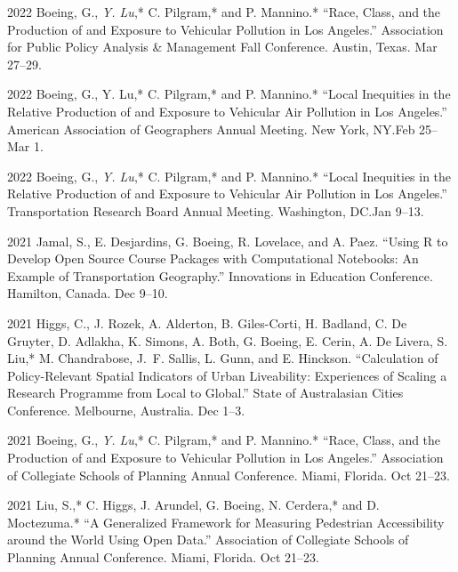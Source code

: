 \documentclass[12pt,letterpaper]{report}
\begin{document}
    \begin{tablist}

        \item[2022] \tab{}Boeing, G., \textit{Y. Lu},* C. Pilgram,* and P. Mannino.* \enquote{Race, Class, and the Production of and Exposure to Vehicular Pollution in Los Angeles.} Association for Public Policy Analysis \& Management Fall Conference. Austin, Texas. Mar 27--29.

        \item[2022] \tab{}Boeing, G., Y. Lu,* C. Pilgram,* and P. Mannino.* \enquote{Local Inequities in the Relative Production of and Exposure to Vehicular Air Pollution in Los Angeles.} American Association of Geographers Annual Meeting. New York, NY.\@ Feb 25--Mar 1.

        \item[2022] \tab{}Boeing, G., \textit{Y. Lu},* C. Pilgram,* and P. Mannino.* \enquote{Local Inequities in the Relative Production of and Exposure to Vehicular Air Pollution in Los Angeles.} Transportation Research Board Annual Meeting. Washington, DC.\@ Jan 9--13.

        \item[2021] \tab{}Jamal, S., E. Desjardins, G. Boeing, R. Lovelace, and A. Paez. \enquote{Using R to Develop Open Source Course Packages with Computational Notebooks: An Example of Transportation Geography.} Innovations in Education Conference. Hamilton, Canada. Dec 9--10.

        \item[2021] \tab{}Higgs, C., J. Rozek, A. Alderton, B. Giles-Corti, H. Badland, C. De Gruyter, D. Adlakha, K. Simons, A. Both, G. Boeing, E. Cerin, A. De Livera, S. Liu,* M. Chandrabose, J.~F. Sallis, L. Gunn, and E. Hinckson. \enquote{Calculation of Policy-Relevant Spatial Indicators of Urban Liveability: Experiences of Scaling a Research Programme from Local to Global.} State of Australasian Cities Conference. Melbourne, Australia. Dec 1--3.

        \item[2021] \tab{}Boeing, G., \textit{Y. Lu},* C. Pilgram,* and P. Mannino.* \enquote{Race, Class, and the Production of and Exposure to Vehicular Pollution in Los Angeles.} Association of Collegiate Schools of Planning Annual Conference. Miami, Florida. Oct 21--23.

        \item[2021] \tab{}Liu, S.,* C. Higgs, J. Arundel, G. Boeing, N. Cerdera,* and D. Moctezuma.* \enquote{A Generalized Framework for Measuring Pedestrian Accessibility around the World Using Open Data.} Association of Collegiate Schools of Planning Annual Conference. Miami, Florida. Oct 21--23.


\end{tablist}
\end{document}
